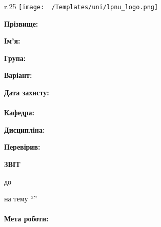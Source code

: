 \Margins
\begin{wrapfigure}[3]{r}{.25\textwidth}
\texttt{[image: ~/Templates/uni/lpnu\_logo.png]} %
\end{wrapfigure}

\noindent\textbf{Прізвище:} \Lname

\noindent\textbf{Ім'я:} \Fname

\noindent\textbf{Група:} \Group

\noindent\textbf{Варіант:} \Variant

\noindent\textbf{Дата захисту:} \Date
\\\\
\noindent\textbf{Кафедра:} \Department

\noindent\textbf{Дисципліна:} \Discipline

\noindent\textbf{Перевірив:} \Reviser


\begin{center}
	\textbf{ЗВІТ}

	до \Work

	на тему ``\Topic''
\end{center}
\paragraph{Мета роботи:}
